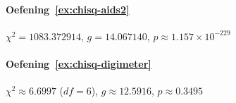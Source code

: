 \paragraph{Oefening~\ref{ex:chisq-aids2}} $\chi^2 = 1083.372914$, $g = 14.067140$, $p \approx 1.157 \times 10^{-229}$

\paragraph{Oefening~\ref{ex:chisq-digimeter}} $\chi^2 \approx 6.6997$ ($df = 6$), $g \approx 12.5916$, $p \approx 0.3495$
